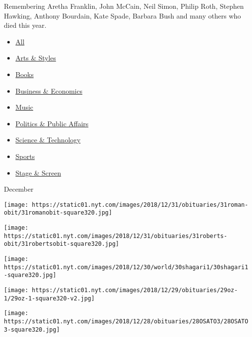 Remembering Aretha Franklin, John McCain, Neil Simon, Philip Roth,
Stephen Hawking, Anthony Bourdain, Kate Spade, Barbara Bush and many
others who died this year.

\begin{itemize}
\tightlist
\item
  \href{notable-deaths.html}{All}
\item
  \href{notable-deaths-arts-styles.html}{Arts \& Styles}
\item
  \href{notable-deaths-books.html}{Books}
\item
  \href{notable-deaths-business-economics.html}{Business \& Economics}
\item
  \href{notable-deaths-music.html}{Music}
\item
  \href{notable-deaths-politics-public-affairs.html}{Politics \& Public
  Affairs}
\item
  \href{notable-deaths-science-technology.html}{Science \& Technology}
\item
  \href{notable-deaths-sports.html}{Sports}
\item
  \href{notable-deaths-stage-screen.html}{Stage \& Screen}
\end{itemize}

December

\href{https://www.nytimes.com/2018/12/30/obituaries/nancy-roman-dies-at-93.html}{}

\texttt{[image: https://static01.nyt.com/images/2018/12/31/obituaries/31roman-obit/31romanobit-square320.jpg]}

\href{https://www.nytimes.com/2018/12/30/obituaries/lawrence-g-roberts-dies-at-81.html}{}

\texttt{[image: https://static01.nyt.com/images/2018/12/31/obituaries/31roberts-obit/31robertsobit-square320.jpg]}

\href{https://www.nytimes.com/2018/12/29/obituaries/shehu-shagari-dead.html}{}

\texttt{[image: https://static01.nyt.com/images/2018/12/30/world/30shagari1/30shagari1-square320.jpg]}

\href{https://www.nytimes.com/2018/12/28/obituaries/amos-oz-dead.html}{}

\texttt{[image: https://static01.nyt.com/images/2018/12/29/obituaries/29oz-1/29oz-1-square320-v2.jpg]}

\href{https://www.nytimes.com/2018/12/26/obituaries/sono-osato-dead.html}{}

\texttt{[image: https://static01.nyt.com/images/2018/12/28/obituaries/28OSATO3/28OSATO3-square320.jpg]}

